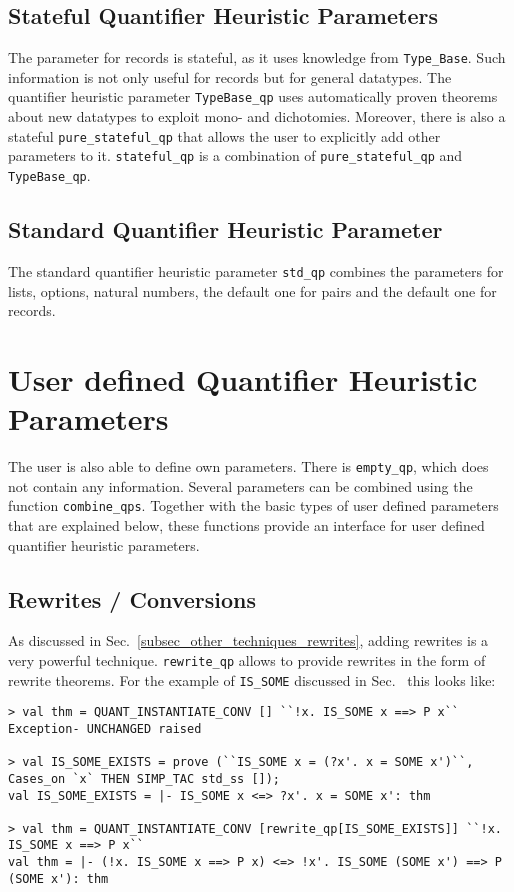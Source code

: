 \documentclass[a4paper,12pt,DIV=12,oneside]{scrbook}
\theoremstyle{definition}
\theoremstyle{remark}
\begin{document}
\subsection{Stateful Quantifier Heuristic Parameters}

The parameter for records is stateful, as it uses knowledge from
\texttt{Type\_Base}. Such information is not only useful for records
but for general datatypes. The quantifier heuristic parameter
\texttt{TypeBase\_qp} uses automatically proven theorems about new
datatypes to exploit mono- and dichotomies. Moreover, there is also a
stateful \texttt{pure\_stateful\_qp} that allows the user to
explicitly add other parameters to it.  \texttt{stateful\_qp} is a
combination of \texttt{pure\_stateful\_qp} and \texttt{TypeBase\_qp}.

\subsection{Standard Quantifier Heuristic Parameter}

The standard quantifier heuristic parameter \texttt{std\_qp} combines
the parameters for lists, options, natural numbers, the default one
for pairs and the default one for records.


\section{User defined Quantifier Heuristic Parameters}\label{sec_qps_user}

The user is also able to define own parameters. There
is \texttt{empty\_qp}, which does not contain any information. Several
parameters can be combined using the function
\texttt{combine\_qps}. Together with the basic types of user defined
parameters that are explained below, these functions provide an
interface for user defined quantifier heuristic parameters.

\subsection{Rewrites / Conversions}

As discussed in Sec.~\ref{subsec_other_techniques_rewrites}, adding
rewrites is a very powerful technique. \texttt{rewrite\_qp} allows to provide rewrites in the form of rewrite theorems.
For the example of \texttt{IS\_SOME} discussed in Sec.~\label{subsec_other_techniques_rewrites} this
looks like:

{\scriptsize
\begin{verbatim}
> val thm = QUANT_INSTANTIATE_CONV [] ``!x. IS_SOME x ==> P x``
Exception- UNCHANGED raised

> val IS_SOME_EXISTS = prove (``IS_SOME x = (?x'. x = SOME x')``, Cases_on `x` THEN SIMP_TAC std_ss []);
val IS_SOME_EXISTS = |- IS_SOME x <=> ?x'. x = SOME x': thm

> val thm = QUANT_INSTANTIATE_CONV [rewrite_qp[IS_SOME_EXISTS]] ``!x. IS_SOME x ==> P x``
val thm = |- (!x. IS_SOME x ==> P x) <=> !x'. IS_SOME (SOME x') ==> P (SOME x'): thm
\end{verbatim}}
\end{document}
